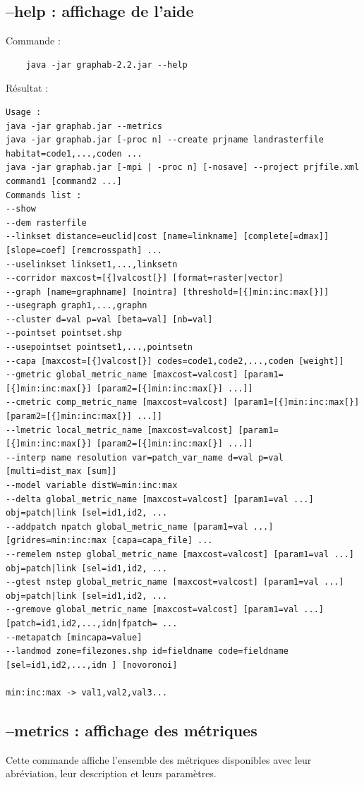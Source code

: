 \documentclass[a4paper,10pt]{report}
\begin{document}
\subsection{--help : affichage de l'aide}
Commande :
\begin{Verbatim}
	java -jar graphab-2.2.jar --help
\end{Verbatim}
Résultat :
\begin{verbatim}
Usage :
java -jar graphab.jar --metrics
java -jar graphab.jar [-proc n] --create prjname landrasterfile habitat=code1,...,coden ...
java -jar graphab.jar [-mpi | -proc n] [-nosave] --project prjfile.xml command1 [command2 ...]
Commands list :
--show
--dem rasterfile
--linkset distance=euclid|cost [name=linkname] [complete[=dmax]] [slope=coef] [remcrosspath] ...
--uselinkset linkset1,...,linksetn
--corridor maxcost=[{]valcost[}] [format=raster|vector]
--graph [name=graphname] [nointra] [threshold=[{]min:inc:max[}]]
--usegraph graph1,...,graphn
--cluster d=val p=val [beta=val] [nb=val]
--pointset pointset.shp
--usepointset pointset1,...,pointsetn
--capa [maxcost=[{]valcost[}] codes=code1,code2,...,coden [weight]]
--gmetric global_metric_name [maxcost=valcost] [param1=[{]min:inc:max[}] [param2=[{]min:inc:max[}] ...]]
--cmetric comp_metric_name [maxcost=valcost] [param1=[{]min:inc:max[}] [param2=[{]min:inc:max[}] ...]]
--lmetric local_metric_name [maxcost=valcost] [param1=[{]min:inc:max[}] [param2=[{]min:inc:max[}] ...]]
--interp name resolution var=patch_var_name d=val p=val [multi=dist_max [sum]]
--model variable distW=min:inc:max
--delta global_metric_name [maxcost=valcost] [param1=val ...] obj=patch|link [sel=id1,id2, ...
--addpatch npatch global_metric_name [param1=val ...] [gridres=min:inc:max [capa=capa_file] ...
--remelem nstep global_metric_name [maxcost=valcost] [param1=val ...] obj=patch|link [sel=id1,id2, ...
--gtest nstep global_metric_name [maxcost=valcost] [param1=val ...] obj=patch|link [sel=id1,id2, ...
--gremove global_metric_name [maxcost=valcost] [param1=val ...] [patch=id1,id2,...,idn|fpatch= ...
--metapatch [mincapa=value]
--landmod zone=filezones.shp id=fieldname code=fieldname [sel=id1,id2,...,idn ] [novoronoi]

min:inc:max -> val1,val2,val3...
\end{verbatim}

\subsection{--metrics : affichage des métriques}
Cette commande affiche l'ensemble des métriques disponibles avec leur abréviation, leur description et leurs paramètres.
\end{document}
